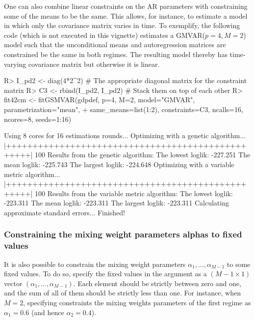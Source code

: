 \documentclass[nojss]{jss}
\begin{document}
One can also combine linear constraints on the AR parameters with constraining some of the means to be the same. This allows, for instance, to estimate a model in which only the covariance matrix varies in time. To exemplify, the following code (which is not executed in this vignette) estimates a GMVAR($p=4, M=2$) model such that the unconditional means and autoregression matrices are constrained be the same in both regimes. The resulting model thereby has time-varying covariance matrix but otherwise it is linear.
%
\begin{CodeChunk}
\begin{CodeInput}
R> I_pd2 <- diag(4*2^2) # The appropriate diagonal matrix for the constraint matrix
R> C3 <- rbind(I_pd2, I_pd2) # Stack them on top of each other
R> fit42cm <- fitGSMVAR(gdpdef, p=4, M=2, model="GMVAR", parametrization="mean",
+    same_means=list(1:2), constraints=C3, ncalls=16, ncores=8, seeds=1:16)
\end{CodeInput}
\begin{CodeOutput}
Using 8 cores for 16 estimations rounds...
Optimizing with a genetic algorithm...
  |++++++++++++++++++++++++++++++++++++++++++++++++++| 100%
Results from the genetic algorithm:
The lowest loglik:  -227.251
The mean loglik:    -225.743
The largest loglik: -224.648
Optimizing with a variable metric algorithm...
  |++++++++++++++++++++++++++++++++++++++++++++++++++| 100%
Results from the variable metric algorithm:
The lowest loglik:  -223.311
The mean loglik:    -223.311
The largest loglik: -223.311
Calculating approximate standard errors...
Finished!
\end{CodeOutput}
\end{CodeChunk}
%

\subsubsection{Constraining the mixing weight parameters alphas to fixed values}

It is also possible to constrain the mixing weight parameters $\alpha_1,...,\alpha_{M-1}$ to some fixed values. To do so, specify the fixed values in the argument  as a $(M-1\times 1)$ vector $(\alpha_1,...,\alpha_{M-1})$. Each element should be strictly between zero and one, and the sum of all of them should be strictly less than one. For instance, when $M=2$, specifying  constraints the mixing weights parameters of the first regime as $\alpha_1=0.6$ (and hence $\alpha_2=0.4$).
\end{document}
